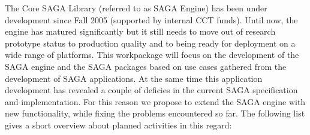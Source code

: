 \documentclass[10pt,letterpaper]{article}
\begin{document}

The Core SAGA Library (referred to as SAGA Engine)  has been
under development since Fall 2005 (supported by internal CCT funds).
Until now, the engine has matured significantly but it still needs 
to move out of research prototype status to production quality
and to being ready for deployment on a wide range of platforms. This 
workpackage will focus on the development of the SAGA engine and the SAGA 
packages based on use cases gathered from the development of
SAGA applications. At the same time this application development has revealed a couple of
deficies in the current SAGA specification and implementation. For this 
reason we propose to extend the SAGA engine with new functionality, 
while fixing the problems encountered so far. The following list gives a
short overview about planned activities in this regard:
\end{document}
